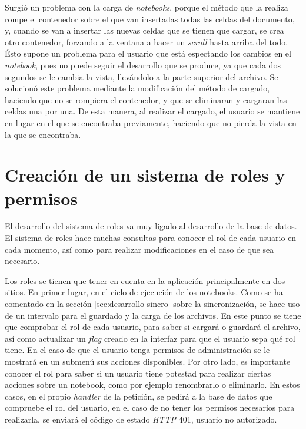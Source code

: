 \documentclass[11pt,spanish,listoffigures,listoftables]{tfgetsinf}
\begin{document}
Surgió un problema con la carga de \textit{notebooks}, porque el método que la realiza rompe el contenedor sobre el que van insertadas todas las celdas del documento, y, cuando se van a insertar las nuevas celdas que se tienen que cargar, se crea otro contenedor, forzando a la ventana a hacer un \textit{scroll} hasta arriba del todo. Ésto supone un problema para el usuario que está espectando los cambios en el \textit{notebook}, pues no puede seguir el desarrollo que se produce, ya que cada dos segundos se le cambia la vista, llevándolo a la parte superior del archivo. Se solucionó este problema mediante la modificación del método de cargado, haciendo que no se rompiera el contenedor, y que se eliminaran y cargaran las celdas una por una. De esta manera, al realizar el cargado, el usuario se mantiene en lugar en el que se encontraba previamente, haciendo que no pierda la vista en la que se encontraba.



\section{Creación de un sistema de roles y permisos}
\label{sec:desarrollo-roles}

El desarrollo del sistema de roles va muy ligado al desarrollo de la base de datos. El sistema de roles hace muchas consultas para conocer el rol de cada usuario en cada momento, así como para realizar modificaciones en el caso de que sea necesario. 

Los roles se tienen que tener en cuenta en la aplicación principalmente en dos sitios. En primer lugar, en el ciclo de ejecución de los notebooks. Como se ha comentado en la sección \ref{sec:desarrollo-sincro} sobre la sincronización, se hace uso de un intervalo para el guardado y la carga de los archivos. En este punto se tiene que comprobar el rol de cada usuario, para saber si cargará o guardará el archivo, así como actualizar un \textit{flag} creado en la interfaz para que el usuario sepa qué rol tiene. En el caso de que el usuario tenga permisos de administración se le mostrará en un submenú sus acciones disponibles. Por otro lado, es importante conocer el rol para saber si un usuario tiene potestad para realizar ciertas acciones sobre un notebook, como por ejemplo renombrarlo o eliminarlo. En estos casos, en el propio \textit{handler} de la petición, se pedirá a la base de datos que compruebe el rol del usuario, en el caso de no tener los permisos necesarios para realizarla, se enviará el código de estado \textit{HTTP} 401, usuario no autorizado. 
\end{document}
